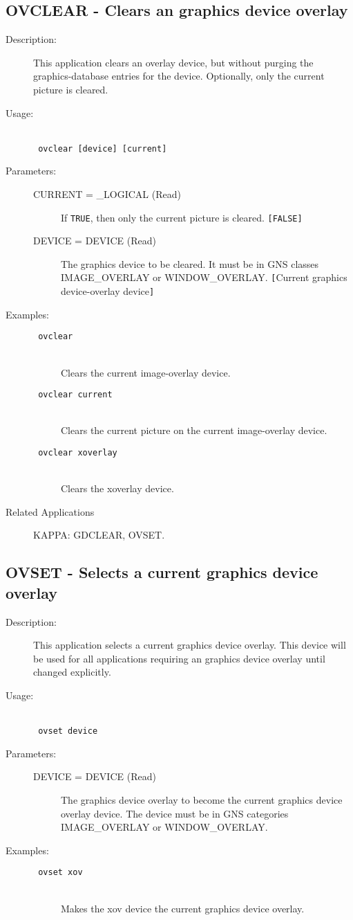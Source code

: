 \documentclass[twoside,11pt]{article}
\newcommand{\stardocinitials}  {SUN}
\newcommand{\stardocnumber}    {239.2}
\newcommand{\stardocname}{\stardocinitials /\stardocnumber}
\newcommand{\htmlref}[2]{#1}
\newcommand{\xlabel}[1]{}
\newlength{\sstbannerlength}
\newlength{\sstcaptionlength}
\newlength{\sstexampleslength}
\newlength{\sstexampleswidth}
\newcommand{\sstroutine}[3]{
   \goodbreak
   \markboth{{\stardocname}~ --- #1}{{\stardocname}~ --- #1}
   \rule{\textwidth}{0.5mm}
   \vspace{-7ex}
   \newline
   \settowidth{\sstbannerlength}{{\Large {\bf #1}}}
   \setlength{\sstcaptionlength}{\textwidth}
   \setlength{\sstexampleslength}{\textwidth}
   \addtolength{\sstbannerlength}{0.5em}
   \addtolength{\sstcaptionlength}{-2.0\sstbannerlength}
   \addtolength{\sstcaptionlength}{-4.9pt}
   \settowidth{\sstexampleswidth}{{\bf Examples:}}
   \addtolength{\sstexampleslength}{-\sstexampleswidth}
   \parbox[t]{\sstbannerlength}{\flushleft{\Large {\bf #1}}}
   \parbox[t]{\sstcaptionlength}{\center{\Large #2}}
   \parbox[t]{\sstbannerlength}{\flushright{\Large {\bf #1}}}
   \begin{description}
      #3
   \end{description}
}
\newcommand{\sstdescription}[1]{\item[Description:] #1}
\newcommand{\sstusage}[1]{\pagebreak[3] \item[Usage:] \mbox{} \\[1.3ex] {\ssttt #1}}
\newcommand{\sstparameters}[1]{
   \goodbreak 
   \item[Parameters:] \mbox{} \\
   \vspace{-3.5ex}
   \begin{description}
      #1
   \end{description}
}
\newcommand{\sstexamples}[1]{
   \goodbreak
   \item[Examples:] \mbox{} \\
   \vspace{-3.5ex}
   \begin{description}
      #1
   \end{description}
}
\newcommand{\sstsubsection}[1]{ \item[{#1}] \mbox{} \\}
\newcommand{\sstexamplesubsection}[2]{\sloppy \item{\ssttt #1} \mbox{} \\ #2 }
\newcommand{\sstdiytopic}[2]{\goodbreak \item[{\hspace{-0.35em}#1\hspace{-0.35em}:}] \mbox{} \\[1.3ex] #2}
\newcommand{\ssttt}{\tt}
\renewcommand{\sstroutine}[3]{
      \subsection{#1\xlabel{#1}-\label{#1}#2}
      \begin{description}
         #3
      \end{description}
   }
\renewcommand{\sstdescription}[1]{\item[Description:]
      \begin{description}
         #1
      \end{description}
   }
\renewcommand{\sstusage}[1]{\htmlref{\item[Usage:]}{ap:usage} \mbox{} \\ {\ssttt #1}}
\renewcommand{\sstparameters}[1]{
      \htmlref{\item[Parameters:]}{se:param}
      \begin{description}
         #1
      \end{description}
   }
\renewcommand{\sstexamples}[1]{
      \htmlref{\item[Examples:]}{ap:example}
      \begin{description}
         #1
      \end{description}
   }
\renewcommand{\sstsubsection}[1]{\item[{#1}]}
\renewcommand{\sstexamplesubsection}[2]{\item[{\ssttt #1}] \\ #2}
\renewcommand{\sstdiytopic}[2]{\item[{#1}]
      \begin{description}
         #2
      \end{description}
   }
\begin{document}
\sstroutine{
   OVCLEAR
}{
   Clears an graphics device overlay
}{
   \sstdescription{
      This application clears an overlay device, but without purging
      the graphics-database entries for the device.  Optionally, only
      the current picture is cleared.
   }
   \sstusage{
      ovclear [device] [current]
   }
   \sstparameters{
      \sstsubsection{
         CURRENT = \_LOGICAL (Read)
      }{
         If {\tt TRUE}, then only the current picture is cleared. {\tt [FALSE]}
      }
      \sstsubsection{
         DEVICE = DEVICE (Read)
      }{
         The graphics device to be cleared.  It must be in GNS classes
         IMAGE\_OVERLAY or WINDOW\_OVERLAY.
         {\tt [}Current graphics device-overlay device{\tt ]}
      }
   }
   \sstexamples{
      \sstexamplesubsection{
         ovclear
      }{
         Clears the current image-overlay device.
      }
      \sstexamplesubsection{
         ovclear current
      }{
         Clears the current picture on the current image-overlay device.
      }
      \sstexamplesubsection{
         ovclear xoverlay
      }{
         Clears the xoverlay device.
      }
   }
   \sstdiytopic{
      Related Applications
   }{
      KAPPA: GDCLEAR, OVSET.
   }
}
 
\sstroutine{
   OVSET
}{
   Selects a current graphics device overlay
}{
   \sstdescription{
      This application selects a current graphics device overlay. This
      device will be used for all applications requiring an
      graphics device overlay until changed explicitly.
   }
   \sstusage{
      ovset device
   }
   \sstparameters{
      \sstsubsection{
         DEVICE = DEVICE (Read)
      }{
         The graphics device overlay to become the current graphics device
         overlay device.  The device must be in GNS categories
         IMAGE\_OVERLAY or WINDOW\_OVERLAY.
      }
   }
   \sstexamples{
      \sstexamplesubsection{
         ovset xov
      }{
         Makes the xov device the current graphics device overlay.
      }
   }
}
 
\end{document}
